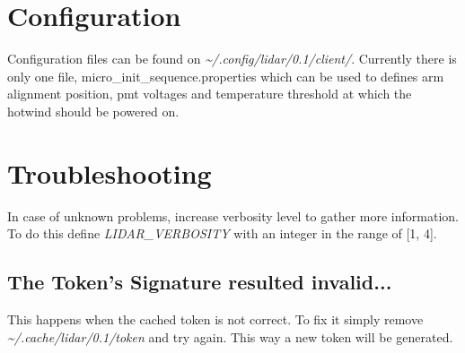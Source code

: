 \documentclass[letterpaper, 10 pt]{article}
\begin{document}
\section{Configuration}
Configuration files can be found on \textit{\~{}/.config/lidar/0.1/client/}. Currently there is only one file, micro\_init\_sequence.properties which can be used to defines arm alignment position, pmt voltages and temperature threshold at which the hotwind should be powered on.

\section{Troubleshooting}
In case of unknown problems, increase verbosity level to gather more information. To do this define \emph{LIDAR\_VERBOSITY} with an integer in the range of [1, 4].
\subsection{The Token's Signature resulted invalid...}
This happens when the cached token is not correct. To fix it simply remove \textit{\~{}/.cache/lidar/0.1/token} and try again. This way a new token will be generated.

\newpage

%
\end{document}
